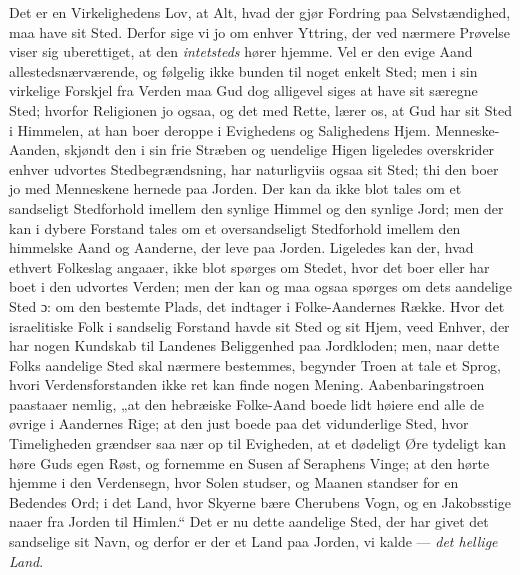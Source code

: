 \documentclass[12pt,a4paper]{book}
\begin{document}
Det er en Virkelighedens Lov, at Alt, hvad der gjør Fordring paa
Selvstændighed, maa have sit Sted. Derfor sige vi jo om enhver Yttring, der ved
nærmere Prøvelse viser sig uberettiget, at den \emph{intetsteds} hører hjemme.
Vel er den evige Aand allestedsnærværende, og følgelig ikke bunden til noget
enkelt Sted; men i sin virkelige Forskjel fra Verden maa Gud dog alligevel siges
at have sit særegne Sted; hvorfor Religionen jo ogsaa, og det med Rette, lærer
os, at Gud har sit Sted i Himmelen, at han boer deroppe i Evighedens og
Salighedens Hjem. Menneske-Aanden, skjøndt den i sin frie Stræben og uendelige
Higen ligeledes overskrider enhver udvortes Stedbegrændsning, har naturligviis
ogsaa sit Sted; thi den boer jo med Menneskene hernede paa Jorden. Der kan da
ikke blot tales om et sandseligt Stedforhold imellem den synlige Himmel og den
synlige Jord; men der kan i dybere Forstand tales om et oversandseligt
Stedforhold imellem den himmelske Aand og Aanderne, der leve paa Jorden.
Ligeledes kan der, hvad ethvert Folkeslag angaaer, ikke blot spørges om Stedet,
hvor det boer eller har boet i den udvortes Verden; men der kan og maa ogsaa
spørges om dets aandelige Sted ɔ: om den bestemte Plads, det indtager i
Folke-Aandernes Række. Hvor det israelitiske Folk i sandselig Forstand havde sit
Sted og sit Hjem, veed Enhver, der har nogen Kundskab til Landenes Beliggenhed
paa Jordkloden; men, naar dette Folks aandelige Sted skal nærmere bestemmes,
begynder Troen at tale et Sprog, hvori Verdensforstanden ikke ret kan finde
nogen Mening.
Aabenbaringstroen paastaaer nemlig, „at den hebræiske Folke-Aand boede lidt
høiere end alle de øvrige i Aandernes Rige; at den just boede paa det
vidunderlige Sted, hvor Timeligheden grændser saa nær op til Evigheden, at et
dødeligt Øre tydeligt kan høre Guds egen Røst, og fornemme en Susen af
Seraphens Vinge; at den hørte hjemme i den Verdensegn, hvor Solen studser, og
Maanen standser for en Bedendes Ord; i det Land, hvor Skyerne bære Cherubens
Vogn, og en Jakobsstige naaer fra Jorden til Himlen.“ Det er nu dette aandelige
Sted, der har givet det sandselige sit Navn, og derfor er der et Land paa
Jorden, vi kalde --- \emph{det hellige Land}.
\end{document}
